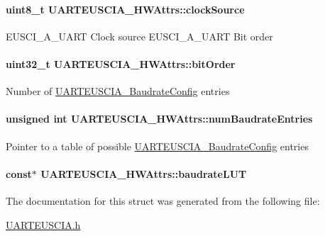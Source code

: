 \paragraph[{clock\-Source}]{\setlength{\rightskip}{0pt plus 5cm}uint8\-\_\-t U\-A\-R\-T\-E\-U\-S\-C\-I\-A\-\_\-\-H\-W\-Attrs\-::clock\-Source}\label{struct_u_a_r_t_e_u_s_c_i_a___h_w_attrs_a159323cc716d9d4fc0f5ece693f3d528}
E\-U\-S\-C\-I\-\_\-\-A\-\_\-\-U\-A\-R\-T Clock source E\-U\-S\-C\-I\-\_\-\-A\-\_\-\-U\-A\-R\-T Bit order 
\paragraph[{bit\-Order}]{\setlength{\rightskip}{0pt plus 5cm}uint32\-\_\-t U\-A\-R\-T\-E\-U\-S\-C\-I\-A\-\_\-\-H\-W\-Attrs\-::bit\-Order}\label{struct_u_a_r_t_e_u_s_c_i_a___h_w_attrs_a48aec31e8f3fb52f3474a00ba00b485b}
Number of \hyperlink{struct_u_a_r_t_e_u_s_c_i_a___baudrate_config}{U\-A\-R\-T\-E\-U\-S\-C\-I\-A\-\_\-\-Baudrate\-Config} entries 
\paragraph[{num\-Baudrate\-Entries}]{\setlength{\rightskip}{0pt plus 5cm}unsigned int U\-A\-R\-T\-E\-U\-S\-C\-I\-A\-\_\-\-H\-W\-Attrs\-::num\-Baudrate\-Entries}\label{struct_u_a_r_t_e_u_s_c_i_a___h_w_attrs_aba3f3da62966d8a0ea9956dafa74aea5}
Pointer to a table of possible \hyperlink{struct_u_a_r_t_e_u_s_c_i_a___baudrate_config}{U\-A\-R\-T\-E\-U\-S\-C\-I\-A\-\_\-\-Baudrate\-Config} entries 
\paragraph[{baudrate\-L\-U\-T}]{ const$\ast$ U\-A\-R\-T\-E\-U\-S\-C\-I\-A\-\_\-\-H\-W\-Attrs\-::baudrate\-L\-U\-T}\label{struct_u_a_r_t_e_u_s_c_i_a___h_w_attrs_a38c226d296905607c444d1d7ec2e04fe}


The documentation for this struct was generated from the following file\-:\begin{DoxyCompactItemize}
\item 
\hyperlink{_u_a_r_t_e_u_s_c_i_a_8h}{U\-A\-R\-T\-E\-U\-S\-C\-I\-A.\-h}\end{DoxyCompactItemize}
